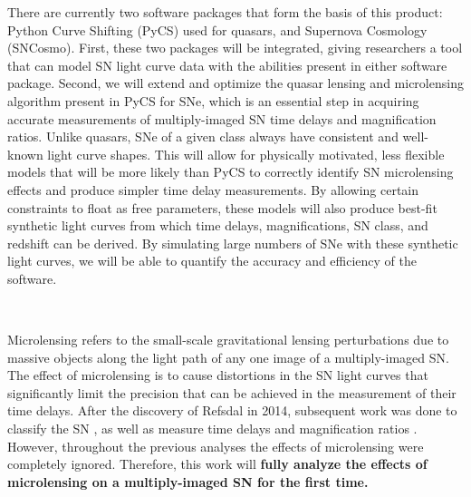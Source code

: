 There are currently two software packages that form the basis 
of this product: Python Curve Shifting (PyCS) used for quasars, and Supernova Cosmology 
(SNCosmo). First, these two packages will be integrated, giving researchers a tool
that can model SN light curve data with the abilities present in either
software package. Second, we will extend and optimize the quasar lensing and microlensing
algorithm present in PyCS for SNe, which is an essential step in acquiring accurate measurements
of multiply-imaged SN time delays and magnification ratios. Unlike quasars, SNe of a given class 
always have consistent and well-known light curve shapes. This will allow for physically motivated, 
less flexible models that will be more likely than PyCS to correctly identify SN 
microlensing effects and produce simpler time delay measurements. By allowing certain constraints to float as free 
parameters, these models will also produce best-fit synthetic light curves from which time delays, magnifications, 
SN class, and redshift can be derived. By simulating large numbers of SNe with these synthetic light curves, we will 
be able to quantify the accuracy and efficiency of the software.
\bigskip


\

Microlensing refers to the small-scale gravitational lensing
perturbations due to massive objects along the light path of any one image of a
multiply-imaged SN. The effect of microlensing is to cause distortions in the SN light
curves that significantly limit the precision that can be achieved in the measurement of 
their time delays. After the discovery of Refsdal in 2014, subsequent work was done to 
classify the SN \citep{Kelly:2016}, as well as measure time delays and magnification
ratios \citep{Rodney:2016}. However, throughout the previous analyses the effects of 
microlensing were completely ignored. Therefore, this work will \textbf{fully analyze the effects
of microlensing on a multiply-imaged SN for the first time.}

